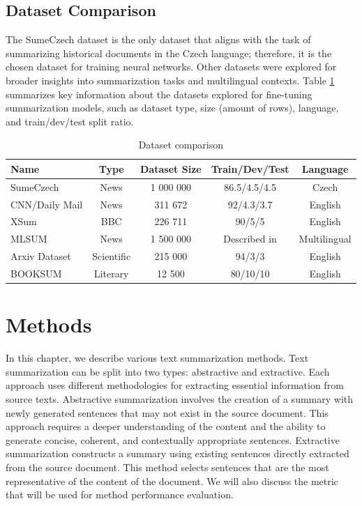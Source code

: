 \documentclass[english, ba, kiv, he, iso690numb, pdf, viewonly]{fasthesis}
\begin{document}
\section{Dataset Comparison}
The SumeCzech dataset is the only dataset that aligns with the task of summarizing historical documents in the Czech language; therefore, it is the chosen dataset for training neural networks. Other datasets were explored for broader insights into summarization tasks and multilingual contexts. Table \ref{tab:datasets} summarizes key information about the datasets explored for fine-tuning summarization models, such as dataset type, size (amount of rows), language, and train/dev/test split ratio.

\begin{table}[htbp]
    \centering
    \caption{Dataset comparison}
    \label{tab:datasets}
    \begin{tabular}{lcccc}
        \toprule
        \textbf{Name} & \textbf{Type} & \textbf{Dataset Size} & \textbf{Train/Dev/Test} & \textbf{Language} \\
        \midrule
        SumeCzech & News & 1 000 000 & 86.5/4.5/4.5 & Czech \\
        CNN/Daily Mail & News & 311 672 & 92/4.3/3.7 & English \\
        XSum & BBC & 226 711 & 90/5/5 & English \\
        MLSUM & News & 1 500 000 & Described in \cite{scialom2020mlsum} & Multilingual \\
        Arxiv Dataset & Scientific & 215 000 & 94/3/3 & English \\
        BOOKSUM & Literary & 12 500 & 80/10/10 & English \\
        \bottomrule
    \end{tabular}
\end{table}


%
%
%
%
\chapter{Methods} \label{methods}
In this chapter, we describe various text summarization methods.  
Text summarization can be split into two types: abstractive and extractive. Each approach uses different methodologies for extracting essential information from source texts. Abstractive summarization involves the creation of a summary with newly generated sentences that may not exist in the source document. This approach requires a deeper understanding of the content and the ability to generate concise, coherent, and contextually appropriate sentences. Extractive summarization constructs a summary using existing sentences directly extracted from the source document. This method selects sentences that are the most representative of the content of the document. We will also discuss the metric that will be used for method performance evaluation.
\end{document}
